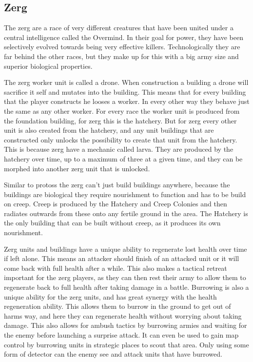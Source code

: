 \subsection{Zerg}
 The zerg are a race of very different creatures that have been united under a central intelligence called the Overmind. In their goal for power, they have been selectively evolved towards being very effective killers. Technologically they are far behind the other races, but they make up for this with a big army size and superior biological properties. 

 The zerg worker unit is called a drone. When construction a building a drone will sacrifice it self and mutates into the building. This means that for every building that the player constructs he looses a worker. In every other way they behave just the same as any other worker. For every race the worker unit is produced from the foundation building, for zerg this is the hatchery. But for zerg every other unit is also created from the hatchery, and any unit buildings that are constructed only unlocks the possibility to create that unit from the hatchery. This is because zerg have a mechanic called larva. They are produced by the hatchery over time, up to a maximum of three at a given time, and they can be morphed into another zerg unit that is unlocked. 

 Similar to protoss the zerg can't just build buildings anywhere, because the buildings are biological they require nourishment to function and has to be build on creep. Creep is produced by the Hatchery and Creep Colonies and then radiates outwards from these onto any fertile ground in the area. The Hatchery is the only building that can be built without creep, as it produces its own nourishment. 

 Zerg units and buildings have a unique ability to regenerate lost health over time if left alone. This means an attacker should finish of an attacked unit or it will come back with full health after a while. This also makes a tactical retreat important for the zerg players, as they can then rest their army to allow them to regenerate back to full health after taking damage in a battle. Burrowing is also a unique ability for the zerg units, and has great synergy with the health regeneration ability. This allows them to burrow in the ground to get out of harms way, and here they can regenerate health without worrying about taking damage. This also allows for ambush tactics by burrowing armies and waiting for the enemy before launching a surprise attack. It can even be used to gain map control by burrowing units in strategic places to scout that area. Only using some form of detector can the enemy see and attack units that have burrowed. 